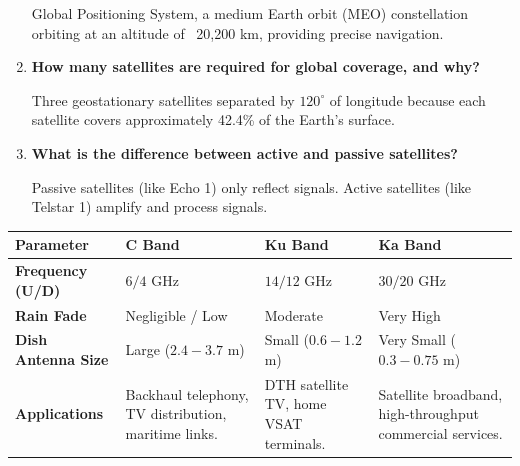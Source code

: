 \documentclass[12pt,a4paper]{article}
\newcommand{\Q}[1]{\textbf{#1}\par\noindent\ignorespaces}
\renewcommand{\arraystretch}{1.45}
\begin{document}
\begin{tcolorbox}[exambox, title={\textbf{Frequently Asked / Viva Questions}}]
\begin{enumerate}[topsep=0pt, label=\textbf{Q\arabic*.}, itemsep=5pt]
    Global Positioning System, a medium Earth orbit (MEO) constellation orbiting at an altitude of ~20,200 km, providing precise navigation.
  \item \Q{How many satellites are required for global coverage, and why?}
    Three geostationary satellites separated by $120^\circ$ of longitude because each satellite covers approximately 42.4\% of the Earth's surface.
  \item \Q{What is the difference between active and passive satellites?}
    Passive satellites (like Echo 1) only reflect signals. Active satellites (like Telstar 1) amplify and process signals.
\end{enumerate}
\end{tcolorbox}

\begin{tcolorbox}[tikzbox, title={Comparison of Satellite Frequency Bands}]
\renewcommand{\arraystretch}{1.4}
\par\noindent
{\renewcommand{\arraystretch}{1.55}%
\begin{tabularx}{\linewidth}{|B{2.5cm}|Y|Y|Y|}\hline
\textbf{Parameter} & \textbf{\color{myteal}C Band} & \textbf{\color{myred}Ku Band} & \textbf{\color{myamber}Ka Band} \\[4pt]
\hline
\textbf{Frequency (U/D)} & $6 / 4$ GHz & $14 / 12$ GHz & $30 / 20$ GHz \\
\hline
\textbf{Rain Fade} & Negligible / Low & Moderate & Very High \\
\hline
\textbf{Dish Antenna Size} & Large ($2.4 - 3.7$ m) & Small ($0.6 - 1.2$ m) & Very Small ($0.3 - 0.75$ m) \\[4pt]
\hline
\textbf{Applications} & Backhaul telephony, TV distribution, maritime links. & DTH satellite TV, home VSAT terminals. & Satellite broadband, high-throughput commercial services. \\[4pt]
\hline
\end{tabularx}
}
\end{tcolorbox}
\end{document}
